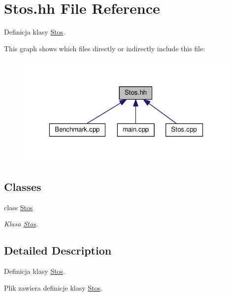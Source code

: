 \hypertarget{a00016}{}\section{Stos.\+hh File Reference}
\label{a00016}


Definicja klasy \hyperlink{a00005}{Stos}.  


This graph shows which files directly or indirectly include this file\+:\nopagebreak
\begin{figure}[H]
\begin{center}
\leavevmode
\includegraphics[width=313pt]{a00030}
\end{center}
\end{figure}
\subsection*{Classes}
\begin{DoxyCompactItemize}
\item 
class \hyperlink{a00005}{Stos}
\begin{DoxyCompactList}\small\item\em Klasa \hyperlink{a00005}{Stos}. \end{DoxyCompactList}\end{DoxyCompactItemize}


\subsection{Detailed Description}
Definicja klasy \hyperlink{a00005}{Stos}. 

Plik zawiera definicje klasy \hyperlink{a00005}{Stos}. 